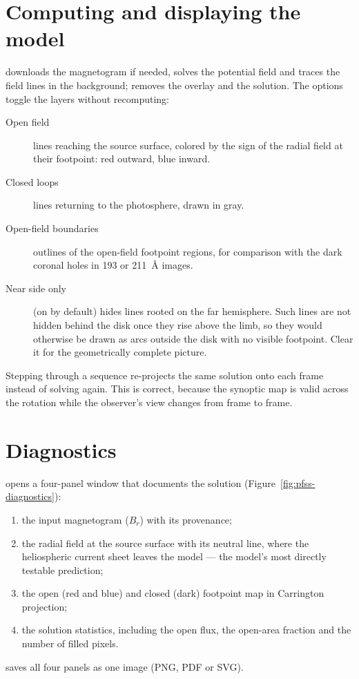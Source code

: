 \section{Computing and displaying the model}

 downloads the magnetogram if needed, solves the potential field and traces
the field lines in the background;  removes the overlay and the solution. The
 options toggle the layers without recomputing:
\begin{description}
  \item[Open field] lines reaching the source surface, colored by the sign of the radial field
    at their footpoint: red outward, blue inward.
  \item[Closed loops] lines returning to the photosphere, drawn in gray.
  \item[Open-field boundaries] outlines of the open-field footpoint regions, for comparison
    with the dark coronal holes in 193 or 211~Å images.
  \item[Near side only] (on by default) hides lines rooted on the far hemisphere. Such lines
    are not hidden behind the disk once they rise above the limb, so they would otherwise be
    drawn as arcs outside the disk with no visible footpoint. Clear it for the geometrically
    complete picture.
\end{description}
Stepping through a sequence re-projects the same solution onto each frame instead of solving
again. This is correct, because the synoptic map is valid across the rotation while the
observer's view changes from frame to frame.

\section{Diagnostics}

 opens a four-panel window that documents the solution
(Figure~\ref{fig:pfss-diagnostics}):
\begin{enumerate}[label=\arabic*.]
  \item the input magnetogram (\(B_r\)) with its provenance;
  \item the radial field at the source surface with its neutral line, where the heliospheric
    current sheet leaves the model --- the model's most directly testable prediction;
  \item the open (red and blue) and closed (dark) footpoint map in Carrington projection;
  \item the solution statistics, including the open flux, the open-area fraction and the
    number of filled pixels.
\end{enumerate}
 saves all four panels as one image (PNG, PDF or SVG).

